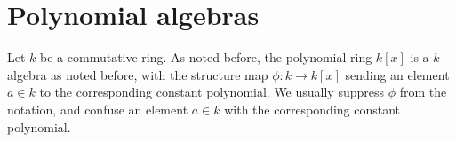 \documentclass [12pt,oneside,a4paper,mathscr]{amsart}
\newtheorem{lemma}[thm]{Lemma}
\theoremstyle{definition}
\newcommand{\R}{\mathbb{R}}
\newcommand{\Fun}{\operatorname{Fun}}
\begin{document}
%
%
%
%


\section{Polynomial algebras}

Let $k$ be a commutative ring. As noted before, the polynomial ring $k[x]$ is a $k$-algebra as noted before, with the structure map $\phi\colon k \to k[x]$ sending an element $a\in k$ to the corresponding constant polynomial. We usually suppress  $\phi$ from the notation, and confuse an element $a\in k$ with the corresponding constant polynomial.
\end{document}
